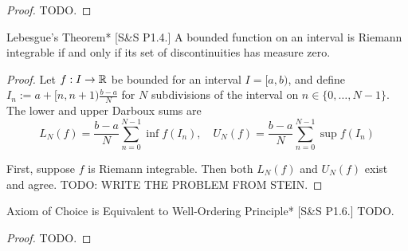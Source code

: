 \begin{proof}
    TODO. 
\end{proof}

\begin{problem}{Lebesgue's Theorem}*
    [S\&S P1.4.] A bounded function on an interval is Riemann integrable if and only if its set of discontinuities has measure zero. 
\end{problem}

\begin{proof}
    Let $f : I \to \mathbb{R}$ be bounded for an interval $I = [a, b)$, and define $I_n := a + [n, n+1) \frac{b-a}{N}$ for $N$ subdivisions of the interval on $n \in \{0, \dots, N-1\}$. The lower and upper Darboux sums are
    $$
    L_N(f) = \frac{b-a}{N} \sum_{n=0}^{N-1} \inf f(I_n), \quad 
    U_N(f) = \frac{b-a}{N} \sum_{n=0}^{N-1} \sup f(I_n)
    $$

    First, suppose $f$ is Riemann integrable. Then both $L_N(f)$ and $U_N(f)$ exist and agree. TODO: WRITE THE PROBLEM FROM STEIN. 
\end{proof}

\begin{problem}{Axiom of Choice is Equivalent to Well-Ordering Principle}*
    [S\&S P1.6.] TODO. 
\end{problem}

\begin{proof}
    TODO. 
\end{proof}

